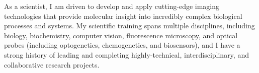 \forceindent As a scientist, I am driven to develop and apply cutting-edge imaging technologies that provide molecular insight into incredibly complex biological processes and systems.  My scientific training spans multiple disciplines, including biology, biochemistry, computer vision, fluorescence microscopy, and optical probes (including optogenetics, chemogenetics, and biosensors), and I have a strong history of leading and completing highly-technical, interdisciplinary, and collaborative research projects. 